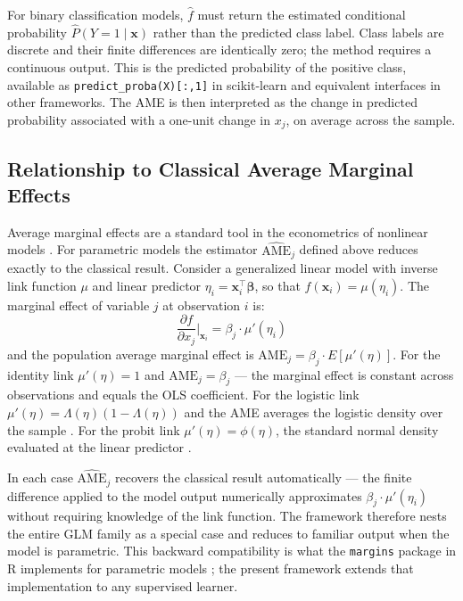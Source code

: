 \documentclass[12pt]{article}
\begin{document}
	For binary classification models, $\hat{f}$ must return the estimated conditional probability $\hat{P}(Y=1 \mid \mathbf{x})$ rather than the predicted class label. Class labels are discrete and their finite differences are identically zero; the method requires a continuous output. This is the predicted probability of the positive class, available as \texttt{predict\_proba(X)[:,1]} in scikit-learn and equivalent interfaces in other frameworks. The AME is then interpreted as the change in predicted probability associated with a one-unit change in $x_j$, on average across the sample.
	
	\subsection{Relationship to Classical Average Marginal Effects}
	
	Average marginal effects are a standard tool in the econometrics of nonlinear models \citep{greene2012, wooldridge2010}. For parametric models the estimator $\widehat{\mathrm{AME}}_j$ defined above reduces exactly to the classical result. Consider a generalized linear model with inverse link function $\mu$ and linear predictor $\eta_i = \mathbf{x}_i^\top \boldsymbol{\beta}$, so that $f(\mathbf{x}_i) = \mu(\eta_i)$. The marginal effect of variable $j$ at observation $i$ is:
	\begin{equation}
		\frac{\partial f}{\partial x_j}\bigg|_{\mathbf{x}_i} = \beta_j \cdot \mu'(\eta_i)
	\end{equation}
	and the population average marginal effect is $\mathrm{AME}_j = \beta_j \cdot E[\mu'(\eta)]$. For the identity link $\mu'(\eta) = 1$ and $\mathrm{AME}_j = \beta_j$ --- the marginal effect is constant across observations and equals the OLS coefficient. For the logistic link $\mu'(\eta) = \Lambda(\eta)(1 - \Lambda(\eta))$ and the AME averages the logistic density over the sample \citep{greene2012}. For the probit link $\mu'(\eta) = \phi(\eta)$, the standard normal density evaluated at the linear predictor \citep{wooldridge2010}.
	
	In each case $\widehat{\mathrm{AME}}_j$ recovers the classical result automatically --- the finite difference applied to the model output numerically approximates $\beta_j \cdot \mu'(\eta_i)$ without requiring knowledge of the link function. The framework therefore nests the entire GLM family as a special case and reduces to familiar output when the model is parametric. This backward compatibility is what the \texttt{margins} package in R implements for parametric models \citep{leeper2021}; the present framework extends that implementation to any supervised learner.
	
\end{document}
